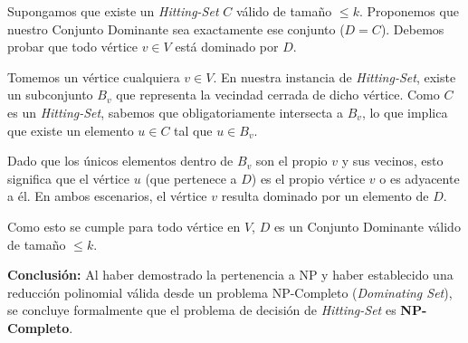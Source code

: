 Supongamos que existe un \textit{Hitting-Set} $C$ válido de tamaño $\leq k$. Proponemos que nuestro Conjunto Dominante sea exactamente ese conjunto ($D = C$). Debemos probar que todo vértice $v \in V$ está dominado por $D$.

Tomemos un vértice cualquiera $v \in V$. En nuestra instancia de \textit{Hitting-Set}, existe un subconjunto $B_v$ que representa la vecindad cerrada de dicho vértice. Como $C$ es un \textit{Hitting-Set}, sabemos que obligatoriamente intersecta a $B_v$, lo que implica que existe un elemento $u \in C$ tal que $u \in B_v$.

Dado que los únicos elementos dentro de $B_v$ son el propio $v$ y sus vecinos, esto significa que el vértice $u$ (que pertenece a $D$) es el propio vértice $v$ o es adyacente a él. En ambos escenarios, el vértice $v$ resulta dominado por un elemento de $D$.

Como esto se cumple para todo vértice en $V$, $D$ es un Conjunto Dominante válido de tamaño $\leq k$.

\vspace{0.5cm}
\textbf{Conclusión:} Al haber demostrado la pertenencia a NP y haber establecido una reducción polinomial válida desde un problema NP-Completo (\textit{Dominating Set}), se concluye formalmente que el problema de decisión de \textit{Hitting-Set} es \textbf{NP-Completo}.